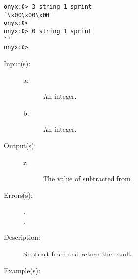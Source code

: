 \begin{description}
\begin{description}
\begin{verbatim}
onyx:0> 3 string 1 sprint
`\x00\x00\x00'
onyx:0>
onyx:0> 0 string 1 sprint
`'
onyx:0>
		\end{verbatim}
	\end{description}
\label{systemdict:sub}
\item[{\onyxop{a b}{sub}{r}}: ]
	\begin{description}\item[]
	\item[Input(s): ]
		\begin{description}\item[]
		\item[a: ]
			An integer.
		\item[b: ]
			An integer.
		\end{description}
	\item[Output(s): ]
		\begin{description}\item[]
		\item[r: ]
			The value of  subtracted from .
		\end{description}
	\item[Errors(s): ]
		\begin{description}\item[]
		\item[.]
		\item[.]
		\end{description}
	\item[Description: ]
		Subtract  from  and return the result.
	\item[Example(s): ]\begin{verbatim}


\end{verbatim}
\end{description}
\end{description}
